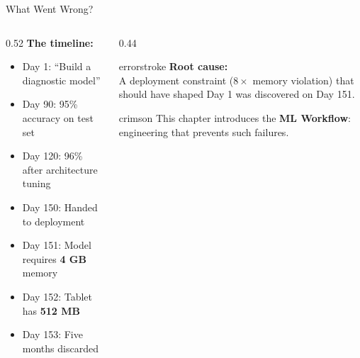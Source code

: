 \documentclass[aspectratio=169, 12pt]{beamer}
\begin{document}
\begin{frame}{What Went Wrong?}
\note{
%
%
%
%
}

\footnotesize
\begin{columns}[T]
  \begin{column}{0.52\textwidth}
    \textbf{The timeline:}
    \begin{itemize}\setlength\itemsep{0pt}
      \item Day 1: ``Build a diagnostic model''
      \item Day 90: 95\% accuracy on test set
      \item Day 120: 96\% after architecture tuning
      \item Day 150: Handed to deployment
      \item Day 151: Model requires \textbf{4 GB} memory
      \item Day 152: Tablet has \textbf{512 MB}
      \item Day 153: Five months discarded
    \end{itemize}
  \end{column}
  \begin{column}{0.44\textwidth}
    \begin{mlsyscard}{errorstroke}
    \textbf{Root cause:}\\[0.05cm]
    {\scriptsize A deployment constraint ($8\times$ memory violation) that should have shaped Day 1 was discovered on Day 151.}
    \end{mlsyscard}

    \vspace{0.1cm}
    \begin{mlsyscard}{crimson}
    {\scriptsize This chapter introduces the \textbf{ML Workflow}: engineering that prevents such failures.}
    \end{mlsyscard}
  \end{column}
\end{columns}

\end{frame}
\end{document}
